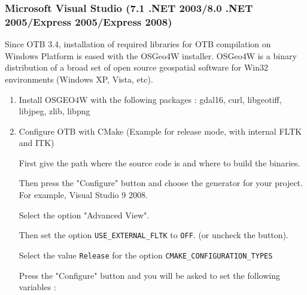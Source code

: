 \subsubsection{Microsoft Visual Studio (7.1 .NET 2003/8.0 .NET 2005/Express 2005/Express 2008)}
Since OTB 3.4, installation of required libraries for OTB compilation on Windows Platform is eased with the  
OSGeo4W installer. OSGeo4W is a binary distribution of a broad set of open source geospatial software 
for Win32 environments (Windows XP, Vista, etc).
\begin{enumerate}

\item Install OSGEO4W with the following packages : gdal16, curl, libgeotiff, libjpeg, zlib, libpng

\item Configure OTB with CMake (Example for release mode, with internal FLTK and ITK)

    First give the path where the source code is and where to build the binaries.

    Then press the "Configure" button and choose the generator for your project. For example, Visual Studio 9 2008.

    Select the option "Advanced View".

    Then set the option \texttt{USE\_EXTERNAL\_FLTK} to \texttt{OFF}. (or uncheck the button).

    Select the value \texttt{Release} for the option \texttt{CMAKE\_CONFIGURATION\_TYPES}

    Press the "Configure" button and you will be asked to set the following variables :


\end{enumerate}
